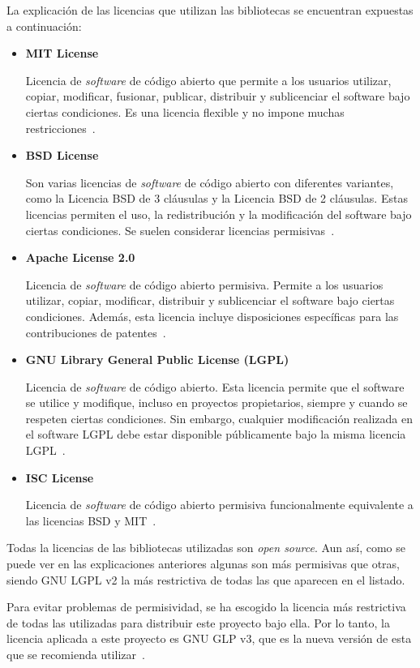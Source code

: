 La explicación de las licencias que utilizan las bibliotecas se encuentran expuestas a continuación:
\begin{itemize}
\item \textbf{MIT License}

Licencia de \textit{software} de código abierto que permite a los usuarios utilizar, copiar, modificar, fusionar, publicar, distribuir y sublicenciar el software bajo ciertas condiciones. Es una licencia flexible y no impone muchas restricciones~\cite{wiki:mit-license}.

\item \textbf{BSD License}

Son varias licencias de \textit{software} de código abierto con diferentes variantes, como la Licencia BSD de 3 cláusulas y la Licencia BSD de 2 cláusulas. Estas licencias permiten el uso, la redistribución y la modificación del software bajo ciertas condiciones. Se suelen considerar licencias permisivas~\cite{wiki:bsd-license}.

\item \textbf{Apache License 2.0}

Licencia de \textit{software} de código abierto permisiva. Permite a los usuarios utilizar, copiar, modificar, distribuir y sublicenciar el software bajo ciertas condiciones. Además, esta licencia incluye disposiciones específicas para las contribuciones de patentes~\cite{apache-license}.

\item \textbf{GNU Library General Public License (LGPL)}

Licencia de \textit{software} de código abierto. Esta licencia permite que el software se utilice y modifique, incluso en proyectos propietarios, siempre y cuando se respeten ciertas condiciones. Sin embargo, cualquier modificación realizada en el software LGPL debe estar disponible públicamente bajo la misma licencia LGPL~\cite{gnu-license}.

\item \textbf{ISC License}

Licencia de \textit{software} de código abierto permisiva funcionalmente equivalente a las licencias BSD y MIT~\cite{wiki:isc-license}.
\end{itemize}

Todas la licencias de las bibliotecas utilizadas son \textit{open source}. 
Aun así, como se puede ver en las explicaciones anteriores algunas son más permisivas que otras, siendo GNU LGPL v2 la más restrictiva de todas las que aparecen en el listado. 

Para evitar problemas de permisividad, se ha escogido la licencia más restrictiva de todas las utilizadas para distribuir este proyecto bajo ella.
Por lo tanto, la licencia aplicada a este proyecto es GNU GLP v3, que es la nueva versión de esta que se recomienda utilizar~\cite{gnu-recomendation}.
